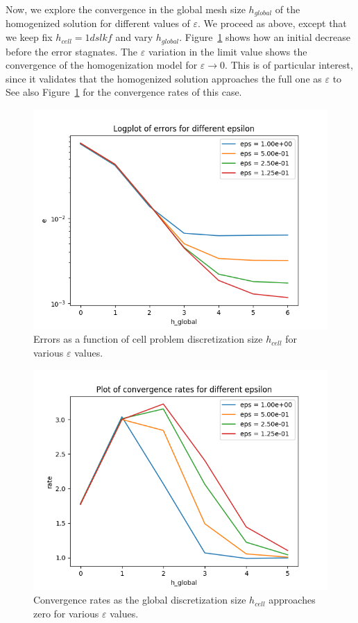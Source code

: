 \documentclass{article}
\renewcommand{\epsilon}{\varepsilon}
\begin{document}
 Now, we explore the convergence in the global mesh size $h_{global}$ of the homogenized solution for different values of $\epsilon$. We proceed as above, except that we keep fix $h_{cell}=1dslkf$ and vary  $h_{global}$. Figure~\ref{fig:two_dim_global_problem_errors} shows how an initial decrease before the error stagnates. The $\epsilon$ variation in the limit value shows the convergence of the homogenization model for $\epsilon\to 0$. This is of particular interest, since it validates that the homogenized solution approaches the full one as $\epsilon$ to   See also Figure~\ref{fig:two_dim_global_problem_errors} for the convergence rates of this case.
   \begin{figure}[h]
    \centering
    \includegraphics[width=0.8\linewidth]{2d_global_errors.png}
    \caption{Errors as a function of cell problem discretization size $h_{cell}$ for various $\epsilon$ values.}
    \label{fig:two_dim_global_problem_errors}
  \end{figure}
   \begin{figure}[h]
    \centering
    \includegraphics[width=0.8\linewidth]{2d_global_rates.png}
    \caption{Convergence rates as the global discretization size $h_{cell}$ approaches zero for various $\epsilon$ values.}
    \label{fig:two_dim_global_problem_rates}
  \end{figure}
\end{document}
